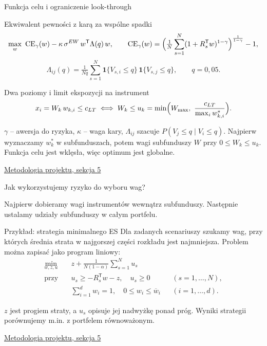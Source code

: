 \documentclass[aspectratio=169,11pt]{beamer}
\newcommand{\CE}{\operatorname{CE}}
\newcommand{\ind}{\mathbf{1}}
\newcommand{\source}[2]{\vfill{\scriptsize\href{#1}{#2}}}
\begin{document}
\begin{frame}{Funkcja celu i ograniczenie look-through}
\small

\begin{block}{Ekwiwalent pewności z karą za wspólne spadki}
\[
  \max_{w}\ \CE_\gamma(w)-\kappa\,\sigma^{EW}\,w^{\mathsf T}\Lambda(q)\,w,
  \qquad
  \CE_\gamma(w)=\Bigl(\tfrac1N\sum_{s=1}^{N}
    (1+R_s^{\mathsf T}w)^{1-\gamma}\Bigr)^{\frac{1}{1-\gamma}}-1,
\]
\[
  \Lambda_{ij}(q)=\tfrac{1}{Nq}\textstyle\sum_{s=1}^{N}
    \ind\{V_{s,i}\le q\}\,\ind\{V_{s,j}\le q\},\qquad q=0{,}05 .
\]
\end{block}

\begin{block}{Dwa poziomy i limit ekspozycji na instrument}
\[
  x_i=W_k\,w_{k,i}\le c_{LT}
  \iff
  W_k\le u_k=\min\Bigl(W_{\max},\ \frac{c_{LT}}{\max_i w^*_{k,i}}\Bigr).
\]
\end{block}

{\small
\(\gamma\) -- awersja do ryzyka, \(\kappa\) -- waga kary, \(\Lambda_{ij}\)
szacuje \(P(V_j\le q\mid V_i\le q)\). Najpierw wyznaczamy \(w_k^*\) w subfunduszach,
potem wagi subfunduszy \(W\) przy \(0\le W_k\le u_k\).
Funkcja celu jest wklęsła, więc optimum jest globalne.
}

\source{https://github.com/michalmarchwiak/bsc-project/blob/main/docs/backtest.md}
       {Metodologia projektu, sekcja 5}
\end{frame}

\begin{frame}{Jak wykorzystujemy ryzyko do wyboru wag?}

Najpierw dobieramy wagi instrumentów wewnątrz subfunduszy.
Następnie ustalamy udziały subfunduszy w całym portfelu.

\begin{block}{Przykład: strategia minimalnego ES}
Dla zadanych scenariuszy szukamy wag, przy których średnia
strata w najgorszej części rozkładu jest najmniejsza.
Problem można zapisać jako program liniowy:
\[
\begin{aligned}
\min_{w,z,u}\quad &
   z+\frac{1}{N(1-\alpha)}\sum_{s=1}^{N}u_s \\[2pt]
\text{przy}\quad &
   u_s\ge -R_s^{\mathsf T}w-z,\quad u_s\ge0
   &&(s=1,\ldots,N),\\
&  \sum_{i=1}^{d}w_i=1,\quad 0\le w_i\le \overline w_i
   &&(i=1,\ldots,d).
\end{aligned}
\]
\end{block}

{\small
\(z\) jest progiem straty, a \(u_s\) opisuje jej nadwyżkę ponad
próg. Wyniki strategii porównujemy m.in. z portfelem równoważonym.
}

\source{https://github.com/michalmarchwiak/bsc-project/blob/main/docs/backtest.md}
       {Metodologia projektu, sekcja 5}
\end{frame}
\end{document}
